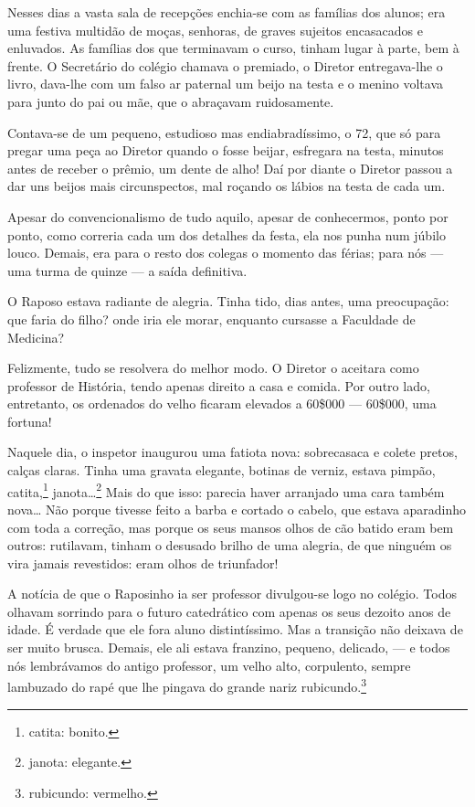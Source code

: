 Nesses dias a vasta sala de recepções enchia-se com as famílias dos
alunos; era uma festiva multidão de moças, senhoras, de graves sujeitos
encasacados e enluvados. As famílias dos que terminavam o curso, tinham
lugar à parte, bem à frente. O Secretário do colégio chamava o premiado,
o Diretor entregava-lhe o livro, dava-lhe com um falso ar paternal um
beijo na testa e o menino voltava para junto do pai ou mãe, que o
abraçavam ruidosamente.

Contava-se de um pequeno, estudioso mas endiabradíssimo, o 72, que só
para pregar uma peça ao Diretor quando o fosse beijar, esfregara na
testa, minutos antes de receber o prêmio, um dente de alho! Daí por
diante o Diretor passou a dar uns beijos mais circunspectos, mal roçando
os lábios na testa de cada um.

Apesar do convencionalismo de tudo aquilo, apesar de conhecermos, ponto
por ponto, como correria cada um dos detalhes da festa, ela nos punha
num júbilo louco. Demais, era para o resto dos colegas o momento das
férias; para nós --- uma turma de quinze --- a saída definitiva.

O Raposo estava radiante de alegria. Tinha tido, dias antes, uma
preocupação: que faria do filho? onde iria ele morar, enquanto cursasse
a Faculdade de Medicina?

Felizmente, tudo se resolvera do melhor modo. O Diretor o aceitara como
professor de História, tendo apenas direito a casa e comida. Por outro
lado, entretanto, os ordenados do velho ficaram elevados a 60\$000 ---
60\$000, uma fortuna!

Naquele dia, o inspetor inaugurou uma fatiota nova: sobrecasaca e colete
pretos, calças claras. Tinha uma gravata elegante, botinas de verniz,
estava pimpão, catita,\footnote{catita: bonito.}
janota\ldots{}\footnote{janota: elegante.} Mais do que isso: parecia
haver arranjado uma cara também nova\ldots{} Não porque tivesse feito a
barba e cortado o cabelo, que estava aparadinho com toda a correção, mas
porque os seus mansos olhos de cão batido eram bem outros: rutilavam,
tinham o desusado brilho de uma alegria, de que ninguém os vira jamais
revestidos: eram olhos de triunfador!

A notícia de que o Raposinho ia ser professor divulgou-se logo no
colégio. Todos olhavam sorrindo para o futuro catedrático com apenas os
seus dezoito anos de idade. É verdade que ele fora aluno distintíssimo.
Mas a transição não deixava de ser muito brusca. Demais, ele ali estava
franzino, pequeno, delicado, --- e todos nós lembrávamos do antigo
professor, um velho alto, corpulento, sempre lambuzado do rapé que lhe
pingava do grande nariz rubicundo.\footnote{rubicundo: vermelho.}

